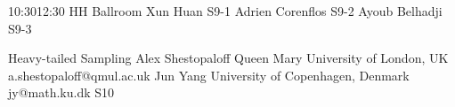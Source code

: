 \documentclass[12pt,lettersize,oneside]{book} %
\begin{document}

\sessionPart{}%
{\hfill{}
{10:30}{12:30} %
{HH Ballroom}} %
{Xun Huan}
{S9-1}
{Adrien Corenflos}
{S9-2}
{Ayoub Belhadji}
{S9-3}



\clearpage

\begin{session}
 {Heavy-tailed Sampling}%
 {Alex Shestopaloff}%
 {Queen Mary University of London, UK}%
 {a.shestopaloff@qmul.ac.uk}%
 {Jun Yang}%
 {University of Copenhagen, Denmark}%
 {jy@math.ku.dk}%
 {S10}%
{}


\end{session}
\end{document}
